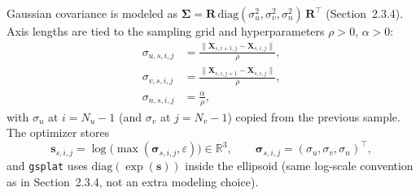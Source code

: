 Gaussian covariance is modeled as $\boldsymbol{\Sigma}=\mathbf{R}\,\mathrm{diag}(\sigma_u^2,\sigma_v^2,\sigma_n^2)\,\mathbf{R}^\top$ (Section~2.3.4). Axis lengths are tied to the sampling grid and hyperparameters $\rho>0$, $\alpha>0$:
\begin{align}
\sigma_{u,s,i,j} &= \frac{\bigl\|\mathbf{X}_{s,i+1,j}-\mathbf{X}_{s,i,j}\bigr\|}{\rho}, \\
\sigma_{v,s,i,j} &= \frac{\bigl\|\mathbf{X}_{s,i,j+1}-\mathbf{X}_{s,i,j}\bigr\|}{\rho}, \\
\sigma_{n,s,i,j} &= \frac{\alpha}{\rho},
\label{eq:gaussian_scales}
\end{align}
with $\sigma_{u}$ at $i=N_u-1$ (and $\sigma_v$ at $j=N_v-1$) copied from the previous sample. The optimizer stores
\begin{equation}
\mathbf{s}_{s,i,j}=\log\bigl(\max(\boldsymbol{\sigma}_{s,i,j},\varepsilon)\bigr)\in\mathbb{R}^3,
\qquad
\boldsymbol{\sigma}_{s,i,j}=(\sigma_u,\sigma_v,\sigma_n)^\top,
\label{eq:log_scales}
\end{equation}
and \texttt{gsplat} uses $\mathrm{diag}(\exp(\mathbf{s}))$ inside the ellipsoid (same log-scale convention as in Section~2.3.4, not an extra modeling choice).

